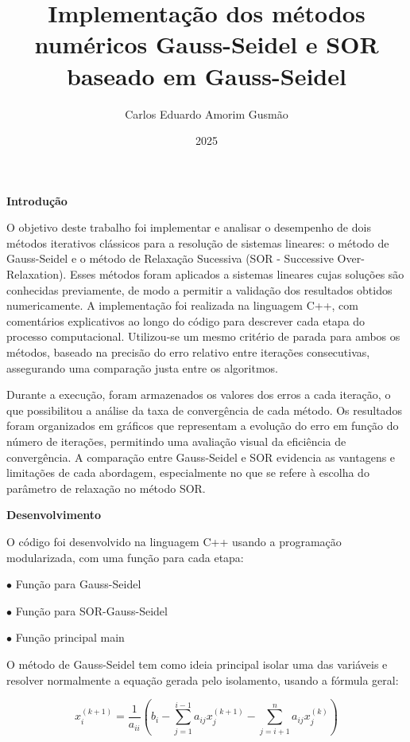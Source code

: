 \documentclass[12pt,a4paper,openany,oneside]{abntex2}
\title{Implementação dos métodos numéricos Gauss-Seidel e SOR baseado em Gauss-Seidel}
\author{Carlos Eduardo Amorim Gusmão}
\date{2025}
\begin{document}
\imprimircapa
\imprimirfolhaderosto

\begin{center}
    \textbf{\large Introdução}
\end{center}


O objetivo deste trabalho foi implementar e analisar o 
desempenho de dois métodos iterativos clássicos para a 
resolução de sistemas lineares: o método de Gauss-Seidel 
e o método de Relaxação Sucessiva (SOR - Successive Over-Relaxation). 
Esses métodos foram aplicados a sistemas lineares cujas soluções 
são conhecidas previamente, de modo a permitir a validação dos 
resultados obtidos numericamente.
A implementação foi realizada na linguagem C++, com comentários 
explicativos ao longo do código para descrever cada etapa do 
processo computacional. Utilizou-se um mesmo critério de parada 
para ambos os métodos, baseado na precisão do erro relativo entre 
iterações consecutivas, assegurando uma comparação justa entre os 
algoritmos.

Durante a execução, foram armazenados os valores dos erros a 
cada iteração, o que possibilitou a análise da taxa de 
convergência de cada método. Os resultados foram organizados 
em gráficos que representam a evolução do erro em função do 
número de iterações, permitindo uma avaliação visual da eficiência 
de convergência. A comparação entre Gauss-Seidel e SOR evidencia 
as vantagens e limitações de cada abordagem, especialmente no que 
se refere à escolha do parâmetro de relaxação no método SOR.
\\
\begin{center}
    \textbf{\large Desenvolvimento}
\end{center}

O código foi desenvolvido na linguagem C++ usando a programação modularizada, com uma função para cada etapa:

$\bullet$ Função para Gauss-Seidel

$\bullet$ Função para SOR-Gauss-Seidel

$\bullet$ Função principal main

O método de Gauss-Seidel tem como ideia principal isolar uma das variáveis
e resolver normalmente a equação gerada pelo isolamento, usando a fórmula geral:

\begin{equation*}
x_i^{(k+1)} = \frac{1}{a_{ii}} \left( b_i - \sum_{j=1}^{i-1} a_{ij} x_j^{(k+1)} - \sum_{j=i+1}^{n} a_{ij} x_j^{(k)} \right)
\nonumber
\end{equation*}
\end{document}
